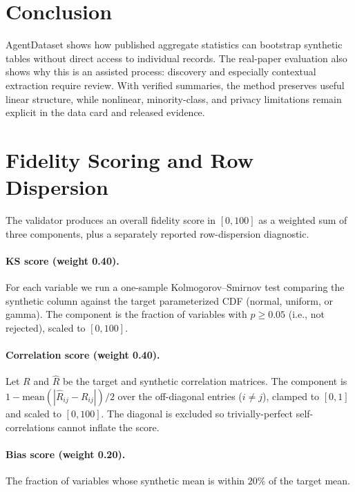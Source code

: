 \documentclass[letterpaper]{article} %
\begin{document}
\section{Conclusion}
AgentDataset shows how published aggregate statistics can bootstrap synthetic
tables without direct access to individual records. The real-paper evaluation
also shows why this is an assisted process: discovery and especially contextual
extraction require review. With verified summaries, the method preserves useful
linear structure, while nonlinear, minority-class, and privacy limitations
remain explicit in the data card and released evidence.



\appendix

\section{Fidelity Scoring and Row Dispersion}
\label{app:scoring}
The validator produces an overall fidelity score in $[0,100]$ as a weighted sum
of three components, plus a separately reported row-dispersion diagnostic.

\paragraph{KS score (weight 0.40).} For each variable we run a one-sample
Kolmogorov--Smirnov test comparing the synthetic column against the target
parameterized CDF (normal, uniform, or gamma). The
component is the fraction of variables with $p \ge 0.05$ (i.e., not rejected),
scaled to $[0,100]$.

\paragraph{Correlation score (weight 0.40).} Let $R$ and $\hat{R}$ be the target
and synthetic correlation matrices. The component is
$1 - \mathrm{mean}(|\hat{R}_{ij} - R_{ij}|)/2$ over the off-diagonal
entries ($i \ne j$), clamped to $[0,1]$ and scaled to $[0,100]$. The diagonal is
excluded so trivially-perfect self-correlations cannot inflate the score.

\paragraph{Bias score (weight 0.20).} The fraction of variables whose synthetic
mean is within $20\%$ of the target mean.
\end{document}
